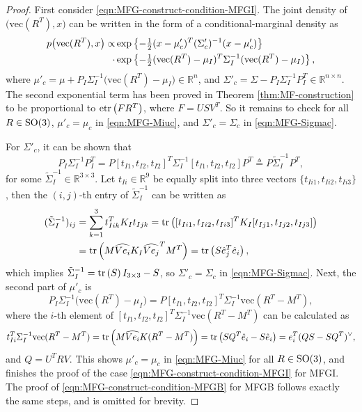 \begin{proof}
	First consider \eqref{eqn:MFG-construct-condition-MFGI}.
	The joint density of $\big(\mathrm{vec}(R^T),x\big)$ can be written in the form of a conditional-marginal density as
	\begin{align}
		p\big(\mathrm{vec}(R^T),x\big) \propto &\exp\left\{ -\tfrac{1}{2}(x-\mu'_c)^T (\Sigma'_c)^{-1} (x-\mu'_c) \right\} \nonumber \\
		\cdot &\exp\left\{ -\tfrac{1}{2}(\mathrm{vec}(R^T)-{\mu}_I)^T \Sigma_I^{-1} (\mathrm{vec}(R^T)-{\mu}_I) \right\},
	\end{align}
	where $\mu'_c = \mu+P_I\Sigma_I^{-1}\big(\mathrm{vec}(R^T)-\mu_I\big) \in \mathbb{R}^n$, and $\Sigma'_c = \Sigma-P_I\Sigma_I^{-1}P_I^T \in \mathbb{R}^{n\times n}$.
	The second exponential term has been proved in Theorem \ref{thm:MF-construction} to be proportional to $\mathrm{etr}\left( FR^T \right)$, where $F=USV^T$.
	So it remains to check for all $R\in\mathrm{SO}(3)$, $\mu'_c = \mu_c$ in \eqref{eqn:MFG-Miuc}, and $\Sigma'_c = \Sigma_c$ in \eqref{eqn:MFG-Sigmac}.
	
	For $\Sigma'_c$, it can be shown that
	\begin{equation*}
		P_I\Sigma_I^{-1}P_I^T = P[t_{I1},t_{I2},t_{I2}]^T\Sigma_I^{-1}[t_{I1},t_{I2},t_{I2}]P^T 
		\triangleq P \tilde{\Sigma}_I^{-1} P^T,
	\end{equation*}
	for some $\tilde{\Sigma}_I^{-1} \in \mathbb{R}^{3\times 3}$.
	Let $t_{Ii}\in\mathbb{R}^9$ be equally split into three vectors $\{t_{Ii1},t_{Ii2},t_{Ii3}\}$, then the $(i,j)$-th entry of $\tilde{\Sigma}_I^{-1}$ can be written as
	\begin{align*}
		(\tilde{\Sigma}_I^{-1})_{ij} &= \sum_{k=1}^3t_{Iik}^T K_I t_{Ijk} = \mathrm{tr}\left( [t_{Ii1},t_{Ii2},t_{Ii3}]^T K_I [t_{Ij1},t_{Ij2},t_{Ij3}] \right) \nonumber \\
		&= \mathrm{tr}\left(  M \widehat{Ve_i} K_I \widehat{Ve_j}^T M^T  \right)
		= \mathrm{tr}\left( S\hat{e}_j^T\hat{e}_i \right),
	\end{align*}
	which implies $\tilde{\Sigma}_I^{-1} = \mathrm{tr}\left( S \right)I_{3 \times 3}-S$, so $\Sigma'_c = \Sigma_c$ in \eqref{eqn:MFG-Sigmac}.
	Next, the second part of $\mu'_c$ is
	\begin{equation*}
		P_I\Sigma_I^{-1}\big(\mathrm{vec}(R^T)-\mu_I\big) = P[t_{I1},t_{I2},t_{I2}]^T\Sigma_I^{-1}\mathrm{vec}(R^T-M^T),
	\end{equation*}
	where the $i$-th element of $[t_{I1},t_{I2},t_{I2}]^T\Sigma_I^{-1}\mathrm{vec}(R^T-M^T)$ can be calculated as
	\begin{gather*}
		t_{Ii}^T\Sigma_I^{-1} \mathrm{vec}(R^T-M^T)
		= \mathrm{tr}\left( M\widehat{Ve_i}K(R^T-M^T) \right) = \mathrm{tr}\left( SQ^T\hat{e}_i - S\hat{e}_i \right) = e_i^T(QS-SQ^T)^\vee, 
	\end{gather*}
	and ${Q} = U^TRV$.
	This shows $\mu'_c = \mu_c$ in \eqref{eqn:MFG-Miuc} for all $R\in\mathrm{SO}(3)$, and finishes the proof of the case \eqref{eqn:MFG-construct-condition-MFGI} for MFGI.
	The proof of \eqref{eqn:MFG-construct-condition-MFGB} for MFGB follows exactly the same steps, and is omitted for brevity.
\end{proof}

